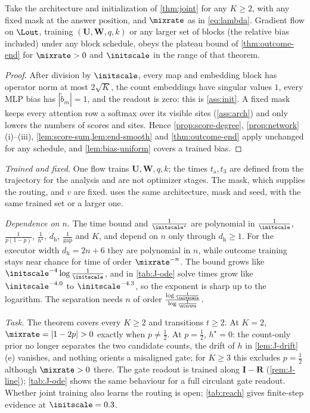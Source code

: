 \begin{corollary}
\label{cor:joint-outcome}
Take the architecture and initialization of \cref{thm:joint} for any $K\ge2$, with any fixed mask at the answer position, and $\mixrate$ as in
\cref{eq:lambda}. Gradient flow on $\Lout$, training $(\mathbf U,\mathbf W,q,k)$ or any larger set of blocks (the relative bias included) under any block
schedule, obeys the plateau bound of \cref{thm:outcome-end} for $\mixrate>0$ and $\initscale$ in the range of that theorem.
\end{corollary}

\begin{proof}
After division by $\initscale$, every map and embedding block has operator norm at most $2\sqrt K$, the count embeddings have singular values
$1$, every MLP bias has $|\tilde b_m|=1$, and the readout is zero: this is \cref{ass:init}. A fixed mask keeps every attention row a softmax over
its visible sites (\cref{ass:arch}) and only lowers the numbers of scores and sites. Hence \cref{prop:score-degree}, \cref{prop:network}(i)--(iii),
\cref{lem:score-sum,lem:end-smooth} and \cref{thm:outcome-end} apply unchanged for any schedule, and \cref{lem:bias-uniform} covers a trained bias.
\end{proof}

\begin{remark}[Scope]
\label{rem:joint-scope}
\emph{Trained and fixed.} One flow trains $\mathbf U,\mathbf W,q,k$; the times $t_{\mathrm a},t_3$ are defined from the trajectory for the analysis and are not
optimizer stages. The mask, which supplies the routing, and $v$ are fixed.  uses the same architecture, mask and
seed, with the same trained set or a larger one.

\emph{Dependence on $n$.} The time bound and $\frac{1}{\initscale^\star}$ are polynomial in $\frac{1}{\initscale}$, $\frac{1}{p(1-p)}$, $\frac{1}{h^\star}$, $d_{\mathrm h}$, $\frac{1}{\mathrm{gap}}$ and $K$, and depend on
$n$ only through $d_{\mathrm h}\ge1$. For the executor width $d_{\mathrm h}=2n+6$ they are polynomial in $n$, while outcome training stays near chance for time of order $\mixrate^{-n}$. The bound grows like $\initscale^{-4}\log\frac{1}{\initscale}$, and in \cref{tab:J-ode} solve times grow like $\initscale^{-4.0}$ to $\initscale^{-4.3}$, so the exponent is
sharp up to the logarithm. The separation needs $n$ of order $\frac{\log\frac{1}{\initscale}}{\log\frac{1}{\mixrate}}$.

\emph{Task.} The theorem covers every $K\ge2$ and transitions $t\ge2$. At $K=2$, $\mixrate=|1-2p|>0$ exactly when $p\neq\frac{1}{2}$. At $p=\frac{1}{2}$,
$h^\star=0$: the count-only prior no longer separates the two candidate counts, the drift of $h$ in \cref{lem:J-drift}(e) vanishes, and
nothing orients a misaligned gate; for $K\ge3$ this excludes $p=\frac{1}{2}$ although $\mixrate>0$ there. The gate readout is trained along
$\mathbf I-\mathbf R$ (\cref{rem:J-line}); \cref{tab:J-ode} shows the same behaviour for a full circulant gate readout. Whether joint training also learns the routing is open;
\cref{tab:reach} gives finite-step evidence at $\initscale=0.3$.
\end{remark}

